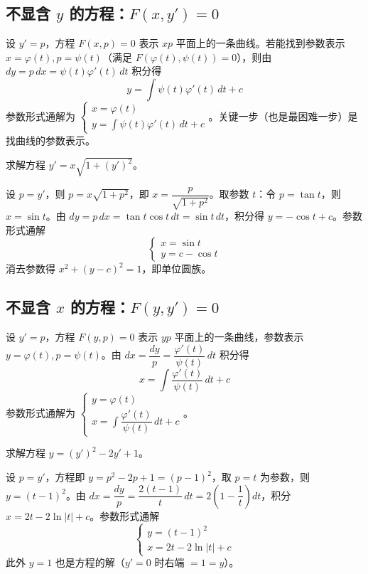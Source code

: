 \subsection{不显含 $y$ 的方程：$F(x, y') = 0$}

设 $y' = p$，方程 $F(x, p) = 0$ 表示 $xp$ 平面上的一条曲线。若能找到参数表示 $x = \varphi(t), p = \psi(t)$（满足 $F(\varphi(t), \psi(t)) = 0$），则由 $dy = p\,dx = \psi(t)\varphi'(t)\,dt$ 积分得
$$y = \int \psi(t)\varphi'(t)\,dt + c$$
参数形式通解为 $\begin{cases} x = \varphi(t) \\ y = \int \psi(t)\varphi'(t)\,dt + c \end{cases}$。关键一步（也是最困难一步）是找曲线的参数表示。

\begin{example}
求解方程 $y' = x\sqrt{1 + (y')^2}$。
\end{example}

\begin{solution}
设 $p = y'$，则 $p = x\sqrt{1+p^2}$，即 $x = \dfrac{p}{\sqrt{1+p^2}}$。取参数 $t$：令 $p = \tan t$，则 $x = \sin t$。由 $dy = p\,dx = \tan t \cos t\,dt = \sin t\,dt$，积分得 $y = -\cos t + c$。参数形式通解
$$\begin{cases} x = \sin t \\ y = c - \cos t \end{cases}$$
消去参数得 $x^2 + (y - c)^2 = 1$，即单位圆族。
\end{solution}

\subsection{不显含 $x$ 的方程：$F(y, y') = 0$}

设 $y' = p$，方程 $F(y, p) = 0$ 表示 $yp$ 平面上的一条曲线，参数表示 $y = \varphi(t), p = \psi(t)$。由 $dx = \dfrac{dy}{p} = \dfrac{\varphi'(t)}{\psi(t)}\,dt$ 积分得
$$x = \int \frac{\varphi'(t)}{\psi(t)}\,dt + c$$
参数形式通解为 $\begin{cases} y = \varphi(t) \\ x = \int \dfrac{\varphi'(t)}{\psi(t)}\,dt + c \end{cases}$。

\begin{example}
求解方程 $y = (y')^2 - 2y' + 1$。
\end{example}

\begin{solution}
设 $p = y'$，方程即 $y = p^2 - 2p + 1 = (p-1)^2$，取 $p = t$ 为参数，则 $y = (t-1)^2$。由 $dx = \dfrac{dy}{p} = \dfrac{2(t-1)}{t}\,dt = 2\left(1 - \dfrac{1}{t}\right)dt$，积分 $x = 2t - 2\ln|t| + c$。参数形式通解
$$\begin{cases} y = (t-1)^2 \\ x = 2t - 2\ln|t| + c \end{cases}$$
此外 $y = 1$ 也是方程的解（$y' = 0$ 时右端 $= 1 = y$）。
\end{solution}

